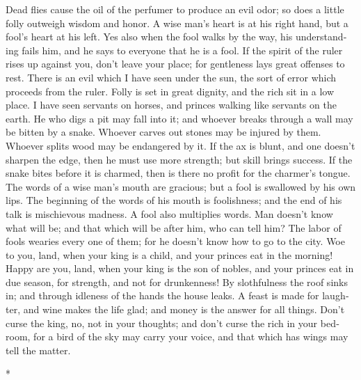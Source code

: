 \begin{paracol}{2}
\begin{otherlanguage}{english}
 Dead flies cause the oil of the perfumer to produce an
evil odor; so does a little folly outweigh wisdom and honor.
 A wise man's heart is at his right hand, but a fool's
heart at his left.  Yes also when the fool walks by the
way, his understanding fails him, and he says to everyone that he is a
fool.  If the spirit of the ruler rises up against you,
don't leave your place; for gentleness lays great offenses to rest.
 There is an evil which I have seen under the sun, the
sort of error which proceeds from the ruler.  Folly is set
in great dignity, and the rich sit in a low place.  I have
seen servants on horses, and princes walking like servants on the earth.
 He who digs a pit may fall into it; and whoever breaks
through a wall may be bitten by a snake.  Whoever carves
out stones may be injured by them. Whoever splits wood may be endangered
by it.  If the ax is blunt, and one doesn't sharpen the
edge, then he must use more strength; but skill brings success.
 If the snake bites before it is charmed, then is there
no profit for the charmer's tongue.  The words of a wise
man's mouth are gracious; but a fool is swallowed by his own lips.
 The beginning of the words of his mouth is foolishness;
and the end of his talk is mischievous madness.  A fool
also multiplies words. Man doesn't know what will be; and that which
will be after him, who can tell him?  The labor of fools
wearies every one of them; for he doesn't know how to go to the city.
 Woe to you, land, when your king is a child, and your
princes eat in the morning!  Happy are you, land, when
your king is the son of nobles, and your princes eat in due season, for
strength, and not for drunkenness!  By slothfulness the
roof sinks in; and through idleness of the hands the house leaks.
 A feast is made for laughter, and wine makes the life
glad; and money is the answer for all things.  Don't
curse the king, no, not in your thoughts; and don't curse the rich in
your bedroom, for a bird of the sky may carry your voice, and that which
has wings may tell the matter.

\end{otherlanguage}

\switchcolumn[0]*

\hypertarget{actuaciuxf3n-inteligente-y-rentable-ante-la-incertidumbre-de-todo-lo-terrenal}{%
}
\end{paracol}
